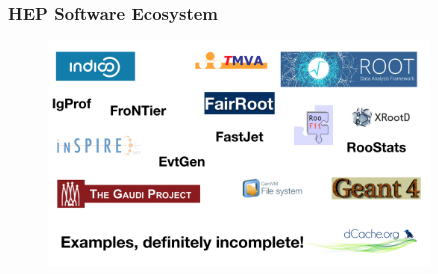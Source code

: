\begin{frame}
\frametitle{HEP Software Ecosystem}

\begin{figure}[htbp]
\begin{center}
\includegraphics[width=0.9\textwidth]{images/hep-software-ecosystem.png}
\end{center}
\end{figure}

\end{frame}


